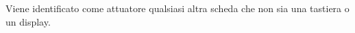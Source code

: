 \documentclass[italian]{article}
\begin{document}
    Viene identificato come attuatore qualsiasi altra scheda che non sia una tastiera o un display. 
    
%    
%    
%    
%       
%       
\end{document}
